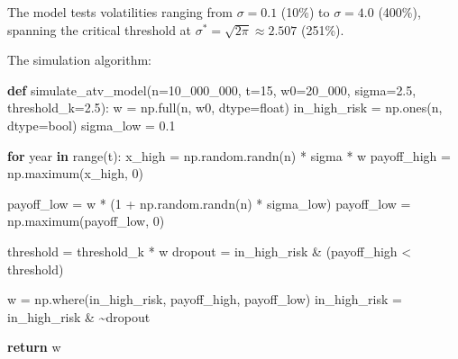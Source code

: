 \documentclass[
  11pt,
  openany]{article}
\newenvironment{Shaded}{}{}
\newcommand{\BuiltInTok}[1]{\textcolor[rgb]{0.00,0.50,0.00}{#1}}
\newcommand{\ControlFlowTok}[1]{\textcolor[rgb]{0.00,0.44,0.13}{\textbf{#1}}}
\newcommand{\DecValTok}[1]{\textcolor[rgb]{0.25,0.63,0.44}{#1}}
\newcommand{\FloatTok}[1]{\textcolor[rgb]{0.25,0.63,0.44}{#1}}
\newcommand{\KeywordTok}[1]{\textcolor[rgb]{0.00,0.44,0.13}{\textbf{#1}}}
\newcommand{\NormalTok}[1]{#1}
\newcommand{\OperatorTok}[1]{\textcolor[rgb]{0.40,0.40,0.40}{#1}}
\begin{document}
The model tests volatilities ranging from \(\sigma = 0.1\) (10\%) to
\(\sigma = 4.0\) (400\%), spanning the critical threshold at
\(\sigma^* = \sqrt{2\pi} \approx 2.507\) (251\%).

The simulation algorithm:

\small

\begin{Shaded}
\begin{Highlighting}[]
\KeywordTok{def}\NormalTok{ simulate\_atv\_model(n}\OperatorTok{=}\DecValTok{10\_000\_000}\NormalTok{, t}\OperatorTok{=}\DecValTok{15}\NormalTok{, w0}\OperatorTok{=}\DecValTok{20\_000}\NormalTok{, sigma}\OperatorTok{=}\FloatTok{2.5}\NormalTok{, threshold\_k}\OperatorTok{=}\FloatTok{2.5}\NormalTok{):}
\NormalTok{    w }\OperatorTok{=}\NormalTok{ np.full(n, w0, dtype}\OperatorTok{=}\BuiltInTok{float}\NormalTok{)}
\NormalTok{    in\_high\_risk }\OperatorTok{=}\NormalTok{ np.ones(n, dtype}\OperatorTok{=}\BuiltInTok{bool}\NormalTok{)}
\NormalTok{    sigma\_low }\OperatorTok{=} \FloatTok{0.1}

    \ControlFlowTok{for}\NormalTok{ year }\KeywordTok{in} \BuiltInTok{range}\NormalTok{(t):}
\NormalTok{        x\_high }\OperatorTok{=}\NormalTok{ np.random.randn(n) }\OperatorTok{*}\NormalTok{ sigma }\OperatorTok{*}\NormalTok{ w}
\NormalTok{        payoff\_high }\OperatorTok{=}\NormalTok{ np.maximum(x\_high, }\DecValTok{0}\NormalTok{)}

\NormalTok{        payoff\_low }\OperatorTok{=}\NormalTok{ w }\OperatorTok{*}\NormalTok{ (}\DecValTok{1} \OperatorTok{+}\NormalTok{ np.random.randn(n) }\OperatorTok{*}\NormalTok{ sigma\_low)}
\NormalTok{        payoff\_low }\OperatorTok{=}\NormalTok{ np.maximum(payoff\_low, }\DecValTok{0}\NormalTok{)}

\NormalTok{        threshold }\OperatorTok{=}\NormalTok{ threshold\_k }\OperatorTok{*}\NormalTok{ w}
\NormalTok{        dropout }\OperatorTok{=}\NormalTok{ in\_high\_risk }\OperatorTok{\&}\NormalTok{ (payoff\_high }\OperatorTok{\textless{}}\NormalTok{ threshold)}

\NormalTok{        w }\OperatorTok{=}\NormalTok{ np.where(in\_high\_risk, payoff\_high, payoff\_low)}
\NormalTok{        in\_high\_risk }\OperatorTok{=}\NormalTok{ in\_high\_risk }\OperatorTok{\&} \OperatorTok{\textasciitilde{}}\NormalTok{dropout}

    \ControlFlowTok{return}\NormalTok{ w}
\end{Highlighting}
\end{Shaded}
\end{document}
